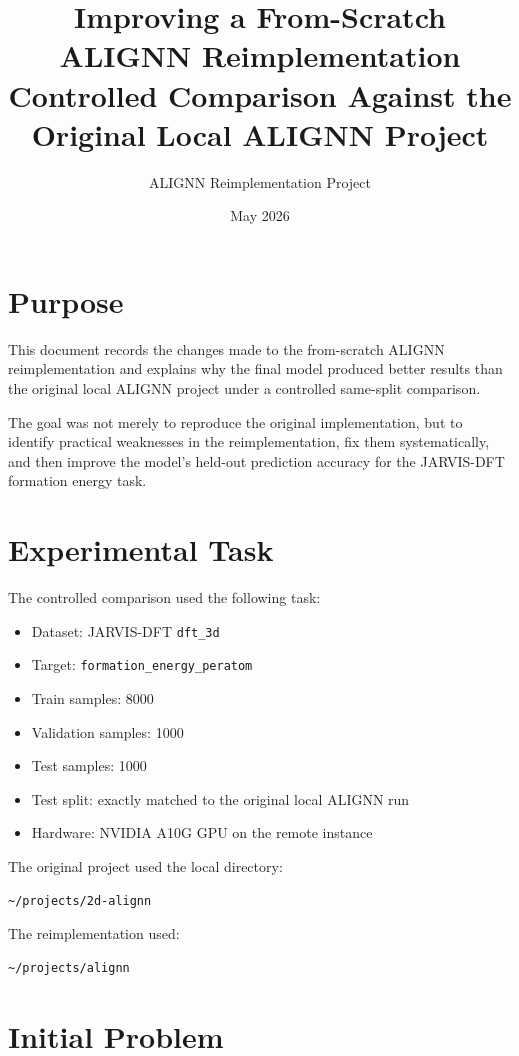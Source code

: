 \documentclass[11pt,a4paper]{article}
\title{Improving a From-Scratch ALIGNN Reimplementation\\
\large Controlled Comparison Against the Original Local ALIGNN Project}
\author{ALIGNN Reimplementation Project}
\date{May 2026}
\begin{document}
\maketitle

\section{Purpose}

This document records the changes made to the from-scratch ALIGNN reimplementation and explains why the final model produced better results than the original local ALIGNN project under a controlled same-split comparison.

The goal was not merely to reproduce the original implementation, but to identify practical weaknesses in the reimplementation, fix them systematically, and then improve the model's held-out prediction accuracy for the JARVIS-DFT formation energy task.

\section{Experimental Task}

The controlled comparison used the following task:

\begin{itemize}
  \item Dataset: JARVIS-DFT \texttt{dft\_3d}
  \item Target: \texttt{formation\_energy\_peratom}
  \item Train samples: 8000
  \item Validation samples: 1000
  \item Test samples: 1000
  \item Test split: exactly matched to the original local ALIGNN run
  \item Hardware: NVIDIA A10G GPU on the remote instance
\end{itemize}

The original project used the local directory:

\begin{verbatim}
~/projects/2d-alignn
\end{verbatim}

The reimplementation used:

\begin{verbatim}
~/projects/alignn
\end{verbatim}

\section{Initial Problem}
\end{document}
